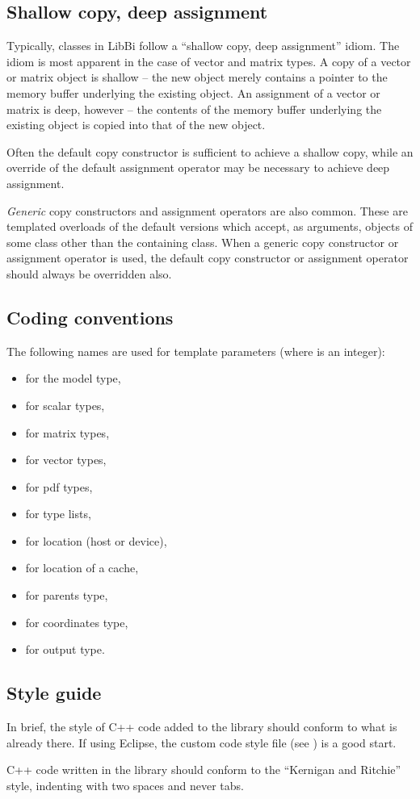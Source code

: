 \subsection{Shallow copy, deep assignment}

Typically, classes in LibBi follow a ``shallow copy, deep assignment''
idiom. The idiom is most apparent in the case of vector and matrix types. A
copy of a vector or matrix object is shallow -- the new object merely contains
a pointer to the memory buffer underlying the existing object. An assignment
of a vector or matrix is deep, however -- the contents of the memory buffer
underlying the existing object is copied into that of the new object.

Often the default copy constructor is sufficient to achieve a shallow copy,
while an override of the default assignment operator may be necessary to
achieve deep assignment.

\emph{Generic} copy constructors and assignment operators are also
common. These are templated overloads of the default versions which accept, as
arguments, objects of some class other than the containing class. When a
generic copy constructor or assignment operator is used, the default copy
constructor or assignment operator should always be overridden also.

\subsection{Coding conventions}

The following names are used for template parameters (where  is an
integer):
\begin{itemize}
\item {} for the model type,
\item {} for scalar types,
\item {} for matrix types,
\item {} for vector types,
\item {} for pdf types,
\item {} for type lists,
\item {} for location (host or device),
\item {} for location of a cache,
\item {} for parents type,
\item {} for coordinates type,
\item {} for output type.
\end{itemize}

\subsection{Style guide}

In brief, the style of C++ code added to the library should conform to what is
already there. If using Eclipse, the custom code style file (see
) is a good start.

C++ code written in the library should conform to the ``Kernigan and Ritchie''
style, indenting with two spaces and never tabs.
